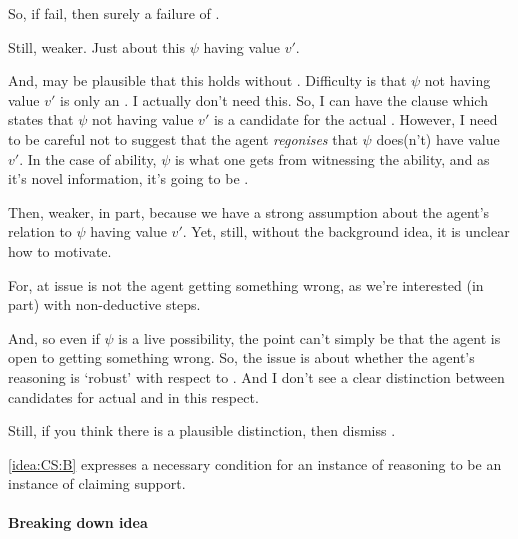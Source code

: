 \begin{note}
  So, if fail, then surely a failure of \ideaCSA{}.

  Still, weaker.
  Just about this \(\psi\) having value \(v'\).

  And, may be plausible that this holds without \ideaCSA{}.
  Difficulty is that \(\psi\) not having value \(v'\) is only an \ep{}.
  I actually don't need this.
  So, I can have the clause which states that \(\psi\) not having value \(v'\) is a candidate for the actual \world{}.
  However, I need to be careful not to suggest that the agent \emph{regonises} that \(\psi\) does(n't) have value \(v'\).
  In the case of ability, \(\psi\) is what one gets from witnessing the ability, and as it's novel information, it's going to be \epAdv{}.

  Then, weaker, in part, because we have a strong assumption about the agent's relation to \(\psi\) having value \(v'\).
  Yet, still, without the background idea, it is unclear how to motivate.

  For, at issue is not the agent getting something wrong, as we're interested (in part) with non-deductive steps.

  And, so even if \(\psi\) is a live possibility, the point can't simply be that the agent is open to getting something wrong.
  So, the issue is about whether the agent's reasoning is `robust' with respect to \epAdv{} .
  And I don't see a clear distinction between candidates for actual \world{} and \epAdv{}  in this respect.

  Still, if you think there is a plausible distinction, then dismiss \ideaCSA{}.
\end{note}






\hozlinedash

\begin{note}
  \autoref{idea:CS:B} expresses a necessary condition for an instance of reasoning to be an instance of claiming support.
\end{note}

\paragraph{Breaking down idea}

